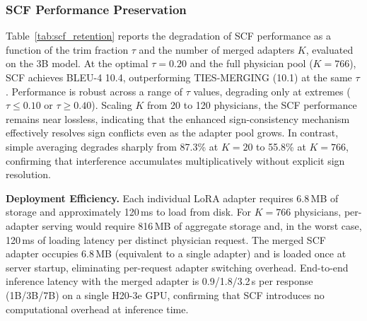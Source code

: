 \subsubsection{SCF Performance Preservation}
Table~\ref{tab:scf_retention} reports the degradation of SCF performance as a function of the trim fraction $\tau$ and the number of merged adapters $K$, evaluated on the 3B model.
At the optimal $\tau=0.20$ and the full physician pool ($K=766$), SCF achieves BLEU-4 10.4, outperforming TIES-MERGING (10.1) at the same $\tau$.
Performance is robust across a range of $\tau$ values, degrading only at extremes ($\tau\le0.10$ or $\tau\ge0.40$).
Scaling $K$ from 20 to 120 physicians, the SCF performance remains near lossless, indicating that the enhanced sign-consistency mechanism effectively resolves sign conflicts even as the adapter pool grows.
In contrast, simple averaging degrades sharply from 87.3\% at $K=20$ to 55.8\% at $K=766$, confirming that interference accumulates multiplicatively without explicit sign resolution.

\textbf{Deployment Efficiency.} Each individual LoRA adapter requires 6.8\,MB of storage and approximately 120\,ms to load from disk.
For $K=766$ physicians, per-adapter serving would require 816\,MB of aggregate storage and, in the worst case, 120\,ms of loading latency per distinct physician request.
The merged SCF adapter occupies 6.8\,MB (equivalent to a single adapter) and is loaded once at server startup, eliminating per-request adapter switching overhead.
End-to-end inference latency with the merged adapter is 0.9/1.8/3.2\,s per response (1B/3B/7B) on a single H20-3e GPU, confirming that SCF introduces no computational overhead at inference time. 


